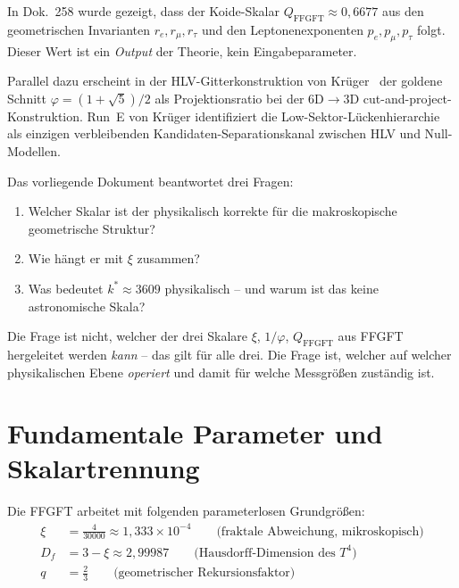 In Dok.~258 wurde gezeigt, dass der Koide-Skalar
$Q_\mathrm{FFGFT} \approx 0{,}6677$ aus den geometrischen Invarianten
$r_e, r_\mu, r_\tau$ und den Leptonenexponenten $p_e, p_\mu, p_\tau$ folgt.
Dieser Wert ist ein \emph{Output} der Theorie, kein Eingabeparameter.

Parallel dazu erscheint in der HLV-Gitterkonstruktion von
Krüger~\cite{krueger275} der goldene Schnitt $\varphi = (1+\sqrt{5})/2$
als Projektionsratio bei der 6D$\to$3D cut-and-project-Konstruktion.
Run~E von Krüger identifiziert die Low-Sektor-Lücken\-hierarchie als einzigen
verbleibenden Kandidaten-Separationskanal zwischen HLV und Null-Modellen.

Das vorliegende Dokument beantwortet drei Fragen:
\begin{enumerate}
  \item Welcher Skalar ist der physikalisch korrekte für die makroskopische
        geometrische Struktur?
  \item Wie hängt er mit $\xi$ zusammen?
  \item Was bedeutet $k^* \approx 3609$ physikalisch -- und warum ist das
        keine astronomische Skala?
\end{enumerate}

\begin{remark}
Die Frage ist nicht, welcher der drei Skalare $\xi$, $1/\varphi$,
$Q_\mathrm{FFGFT}$ aus FFGFT hergeleitet werden \emph{kann} -- das gilt
für alle drei. Die Frage ist, welcher auf welcher physikalischen Ebene
\emph{operiert} und damit für welche Messgrößen zuständig ist.
\end{remark}

\section{Fundamentale Parameter und Skalartrennung}

Die FFGFT arbeitet mit folgenden parameterlosen Grundgrößen:
\begin{align}
  \xi   &= \frac{4}{30000} \approx 1{,}333 \times 10^{-4}
    \qquad \text{(fraktale Abweichung, mikroskopisch)} \label{eq:xi275}\\
  D_f   &= 3 - \xi \approx 2{,}99987
    \qquad \text{(Hausdorff-Dimension des }T^4\text{)} \label{eq:Df275}\\
  q     &= \frac{2}{3}
    \qquad \text{(geometrischer Rekursionsfaktor)} \label{eq:q275}
\end{align}

